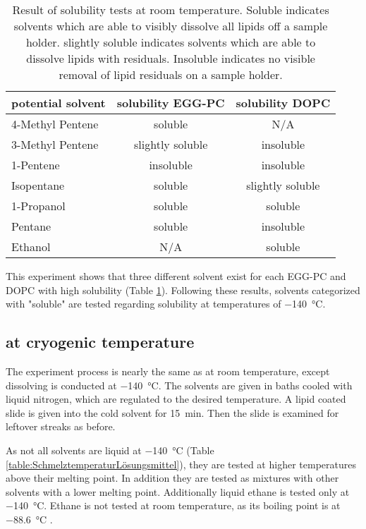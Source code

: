 \begin{table}[hbt!]
	\centering
	\begin{tabular}{|l|c|c|}
		\hline
		potential solvent & solubility EGG-PC & solubility DOPC \\
		\hline
		\hline
		4-Methyl Pentene & soluble & N/A  \\ 
		\hline
		3-Methyl Pentene & slightly soluble & insoluble \\
		\hline
		1-Pentene & insoluble & insoluble \\
		\hline
		Isopentane & soluble & slightly soluble\\
		\hline
		1-Propanol & soluble & soluble\\
		\hline
		Pentane & soluble & insoluble\\
		\hline
		Ethanol & N/A & soluble\\
		\hline
	\end{tabular}
	\caption{Result of solubility tests at room temperature. Soluble indicates solvents which are able to visibly dissolve all lipids off a sample holder. slightly soluble indicates solvents which are able to dissolve lipids with residuals. Insoluble indicates no visible removal of lipid residuals on a sample holder.}
	\label{table:LoeslichkeitRaumtemperatur}
\end{table}

This experiment shows that three different solvent exist for each EGG-PC and DOPC with high solubility (Table \ref{table:LoeslichkeitRaumtemperatur}). Following these results, solvents categorized with "soluble" are tested regarding solubility at temperatures of \SI{-140}{\degreeCelsius}. 

\FloatBarrier
\subsection{at cryogenic temperature}

The experiment process is nearly the same as at room temperature, except dissolving is conducted at \SI{-140}{\degreeCelsius}. 
The solvents are given in baths cooled with liquid nitrogen, which are regulated to the desired temperature. A lipid coated slide is given into the cold solvent for \SI{15}{\minute}. Then the slide is examined for leftover streaks as before.

As not all solvents are liquid at \SI{-140}{\degreeCelsius} (Table \ref{table:SchmelztemperaturLösungsmittel}), they are tested at higher temperatures above their melting point. In addition they are tested as mixtures with other solvents with a lower melting point. Additionally liquid ethane is tested only at  \SI{-140}{\degreeCelsius}. Ethane is not tested at room temperature, as its boiling point is at \SI{-88.6}{\degreeCelsius} \cite{PubChem.29.08.2023}.


